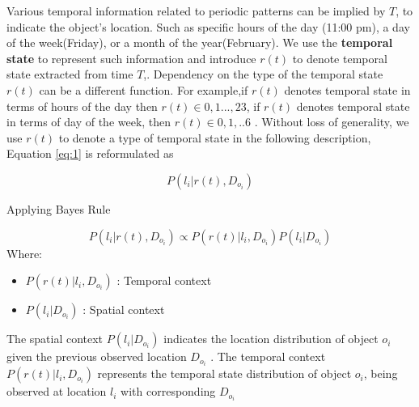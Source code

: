    Various temporal information related to periodic patterns can be implied by $T$, to indicate the object's location. Such as specific hours of the day (11:00 pm), a day of the week(Friday), or a month of the year(February). We use the \textbf{temporal state} to represent such information and introduce $r(t)$ to denote temporal state extracted from time $T$,.  Dependency on the type of the temporal state $r(t)$ can be a different function. For example,if $r(t)$ denotes temporal state in terms of hours of the day then $r(t) \in {0,1 ... , 23}$, if $r(t)$ denotes temporal state in terms of day of the week, then $r(t) \in {0,1, .. 6}$ . Without loss of generality, we use $r(t)$ to denote a type of temporal state in the following description, Equation \ref{eq:1} is reformulated as 
    
    \begin{equation}
	    P( l_i | r(t), D_{o_i})
    \end{equation}
    
    Applying Bayes Rule
    
    \begin{equation}\label{eq:3}
	P( l_i | r(t), D_{o_i}) \propto P(r(t) | l_i, D_{o_i})  P(l_i | D_{o_i})
    \end{equation}
    Where:
    \begin{itemize}[label=]
    \item $P(r(t) | l_i, D_{o_i})$ : Temporal context 
    \item $P(l_i | D_{o_i})$ : Spatial context
    \end{itemize}
    
     The spatial context $P(l_i | D_{o_i})$ indicates the location distribution of object $o_i$ given the previous observed location $D_{o_i}$ . The temporal context $P(r(t) | l_i, D_{o_i})$ represents the temporal state distribution of object $o_i$, being observed at location $l_i$ with corresponding $D_{o_i}$
    



